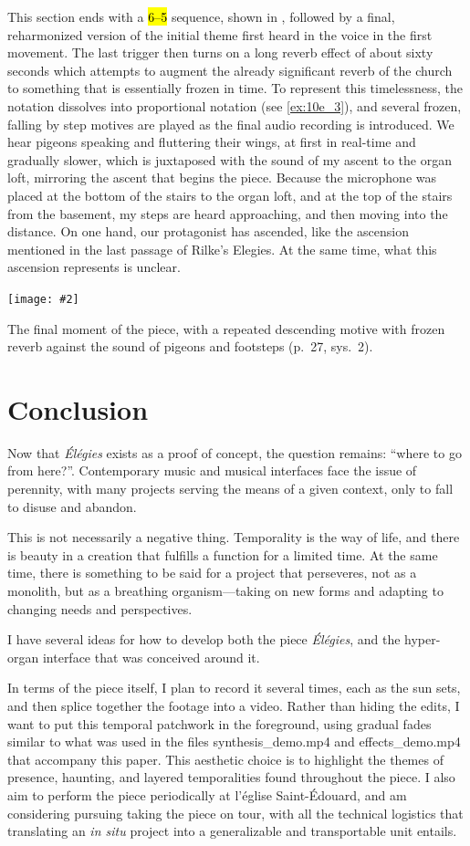 \documentclass[12pt,twoside,maitrise]{dms_ks}
\newcommand{\customincludeexamples}[4][]{%
    \begin{example}[H]
        \centering
        \texttt{[image: \#2]}
        \caption{#4}
	\label{#3} 
    \end{example}
}
\theoremstyle{definition}
\begin{document}
{This section ends with a \hl{6--5} sequence, shown in , followed by a final, reharmonized version of the initial theme first heard in the voice in the first movement. 
The last trigger then turns on a long reverb effect of about sixty seconds which attempts to augment the already significant reverb of the church to something that is essentially frozen in time. 
To represent this timelessness, the notation dissolves into proportional notation (see \cref{ex:10e_3}), and several frozen, falling by step motives are played as the final audio recording is introduced. 
We hear pigeons speaking and fluttering their wings, at first in real-time and gradually slower, which is juxtaposed with the sound of my ascent to the organ loft, mirroring the ascent that begins the piece. 
Because the microphone was placed at the bottom of the stairs to the organ loft, and at the top of the stairs from the basement, my steps are heard approaching, and then moving into the distance. 
On one hand, our protagonist has ascended, like the ascension mentioned in the last passage of Rilke's Elegies. 
At the same time, what this ascension represents is unclear.

\customincludeexamples[width=\textwidth]{10e_3}{ex:10e_3}{The final moment of the piece, with a repeated descending motive with frozen reverb against the sound of pigeons and footsteps (p.~27, sys.~2).}

\chapter*{Conclusion}

Now that \textit{Élégies} exists as a proof of concept, the question remains: “where to go from here?”.
Contemporary music and musical interfaces face the issue of perennity, with many projects serving the means of a given context, only to fall to disuse and abandon. 

This is not necessarily a negative thing.
Temporality is the way of life, and there is beauty in a creation that fulfills a function for a limited time.
At the same time, there is something to be said for a project that perseveres, not as a monolith, but as a breathing organism---taking on new forms and adapting to changing needs and perspectives.   

I have several ideas for how to develop both the piece \textit{Élégies}, and the hyper-organ interface that was conceived around it. 

In terms of the piece itself, I plan to record it several times, each as the sun sets, and then splice together the footage into a video.
Rather than hiding the edits, I want to put this temporal patchwork in the foreground, using gradual fades similar to what was used in the files synthesis\_demo.mp4 and effects\_demo.mp4 that accompany this paper.
This aesthetic choice is to highlight the themes of presence, haunting, and layered temporalities found throughout the piece.
I also aim to perform the piece periodically at l'église Saint-Édouard, and am considering pursuing taking the piece on tour, with all the technical logistics that translating an \textit{in situ} project into a generalizable and transportable unit entails.

}
\end{document}
